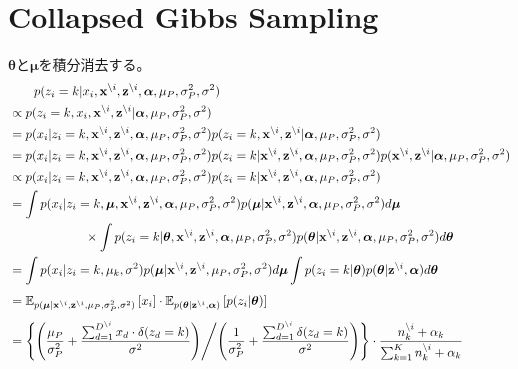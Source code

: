 \documentclass[a4paper,10.5pt,uplatex]{jsarticle}  %
\newcommand{\E}{\mathbb{E}}
\newcommand{\btheta}{\boldsymbol{\theta}}
\newcommand{\balpha}{\boldsymbol{\alpha}}
\newcommand{\bmu}{\boldsymbol{\mu}}
\newcommand{\bz}{\mathbf{z}}
\newcommand{\bx}{\mathbf{x}}
\newcommand{\deli}{{\backslash i}}
\begin{document}
\section{Collapsed Gibbs Sampling}
$\btheta$と$\bmu$を積分消去する。
\begin{align}
  &\qquad p(z_i = k| x_i, \bx^\deli, \bz^\deli, \balpha, \mu_P, \sigma^2_P, \sigma^2)\\
  &\propto p(z_i=k, x_i, \bx^\deli, \bz^\deli | \balpha, \mu_P, \sigma^2_P, \sigma^2)\\
  &= p(x_i | z_i=k, \bx^\deli, \bz^\deli, \balpha, \mu_P, \sigma^2_P, \sigma^2) p(z_i=k, \bx^\deli, \bz^\deli | \balpha, \mu_P, \sigma^2_P, \sigma^2)\\
  &= p(x_i | z_i=k, \bx^\deli, \bz^\deli, \balpha, \mu_P, \sigma^2_P, \sigma^2) p(z_i=k | \bx^\deli, \bz^\deli, \balpha, \mu_P, \sigma^2_P, \sigma^2) p(\bx^\deli, \bz^\deli | \balpha, \mu_P, \sigma^2_P, \sigma^2)\\
  &\propto p(x_i | z_i=k, \bx^\deli, \bz^\deli, \balpha, \mu_P, \sigma^2_P, \sigma^2) p(z_i=k| \bx^\deli, \bz^\deli, \balpha, \mu_P, \sigma^2_P, \sigma^2)\\
  &= \int p(x_i| z_i=k, \bmu, \bx^\deli, \bz^\deli, \balpha, \mu_P, \sigma_P^2, \sigma^2) p(\bmu | \bx^\deli, \bz^\deli, \balpha, \mu_P, \sigma^2_P, \sigma^2) d\bmu \\
  &\qquad \qquad \qquad \times \int p(z_i=k| \btheta, \bx^\deli, \bz^\deli, \balpha, \mu_P, \sigma^2_P, \sigma^2) p(\btheta | \bx^\deli, \bz^\deli, \balpha, \mu_P, \sigma^2_P, \sigma^2) d\btheta\\
  &= \int p(x_i | z_i=k, \mu_k, \sigma^2) p(\bmu | \bx^\deli, \bz^\deli, \mu_P, \sigma^2_P, \sigma^2) d\bmu \int p(z_i =k|\btheta) p(\btheta | \bz^\deli,\balpha) d\btheta\\[3.5pt]
  &= \E_{p(\bmu | \bx^\deli, \bz^\deli, \mu_P, \sigma^2_P, \sigma^2)} \left[ x_i \right] \cdot \E_{p(\btheta | \bz^\deli,\balpha)} \left[ p(z_i | \btheta) \right]\\[4pt]
  &= \left\{ \left( \frac{\mu_P}{\sigma_P^2} + \frac{\sum_{d=1}^{D^{\backslash i}} x_d \cdot \delta(z_d=k)}{\sigma^2} \right) \middle/ \left( \frac{1}{\sigma_P^2} + \frac{\sum_{d=1}^{D^{\backslash i}} \delta (z_d = k)}{\sigma^2} \right)   \right\} \cdot \frac{n_k^{\backslash i} + \alpha_k}{\sum_{k=1}^{K} n_k^{\backslash i} + \alpha_k}
\end{align}
\end{document}
